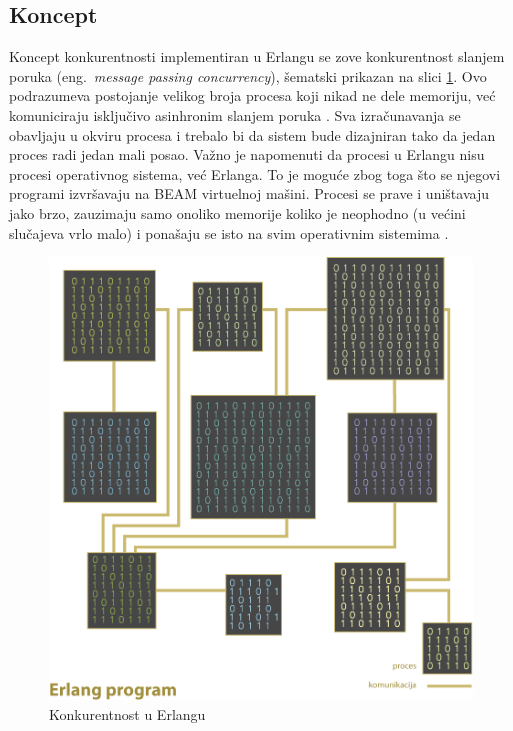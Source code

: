 \documentclass[a4paper]{article}
\begin{document}
\subsection{Koncept}
Koncept konkurentnosti implementiran u Erlangu se zove konkurentnost slanjem poruka (eng.~{\em message passing concurrency}), šematski prikazan na slici \ref{fig:concurrency}. Ovo podrazumeva postojanje velikog broja procesa koji nikad ne dele memoriju, već komuniciraju isključivo asinhronim slanjem poruka \cite{book_joe}.
Sva izračunavanja se obavljaju u okviru procesa i trebalo bi da sistem bude dizajniran tako da jedan proces radi jedan mali posao.
Važno je napomenuti da procesi u Erlangu nisu procesi operativnog sistema, već Erlanga.
To je moguće zbog toga što se njegovi programi izvršavaju na BEAM virtuelnoj mašini.
Procesi se prave i uništavaju jako brzo, zauzimaju samo onoliko memorije koliko je neophodno (u većini slučajeva vrlo malo)
i ponašaju se isto na svim operativnim sistemima \cite{book_joe}.

\begin{figure}[h!]
\begin{center}
\includegraphics[scale=0.5]{concurrency.png}
\end{center}
\caption{Konkurentnost u Erlangu}
\label{fig:concurrency}
\end{figure} 
\end{document}

